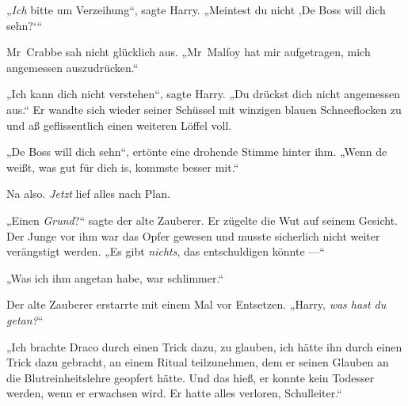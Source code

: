 „\emph{Ich} bitte um Verzeihung“, sagte Harry.
„Meintest du nicht ‚De Boss will dich sehn?‘“

Mr~Crabbe sah nicht glücklich aus.
„Mr~Malfoy hat mir aufgetragen, mich angemessen auszudrücken.“

„Ich kann dich nicht verstehen“, sagte Harry.
„Du drückst dich nicht angemessen aus.“ Er wandte sich wieder seiner Schüssel mit winzigen blauen Schneeflocken zu und aß geflissentlich einen weiteren Löffel voll.

„De Boss will dich sehn“, ertönte eine drohende Stimme hinter ihm.
„Wenn de weißt, was gut für dich is, kommste besser mit.“

Na also. \emph{Jetzt} lief alles nach Plan.


„Einen \emph{Grund}?“ sagte der alte Zauberer. Er zügelte die Wut auf seinem Gesicht. Der Junge vor ihm war das Opfer gewesen und musste sicherlich nicht weiter verängstigt werden.
„Es gibt \emph{nichts}, das entschuldigen könnte —“

„Was ich ihm angetan habe, war schlimmer.“

Der alte Zauberer erstarrte mit einem Mal vor Entsetzen.
„Harry, \emph{was hast du getan?}“

„Ich brachte Draco durch einen Trick dazu, zu glauben, ich hätte ihn durch einen Trick dazu gebracht, an einem Ritual teilzunehmen, dem er seinen Glauben an die Blutreinheitslehre geopfert hätte. Und das hieß, er konnte kein Todesser werden, wenn er erwachsen wird. Er hatte alles verloren, Schulleiter.“

